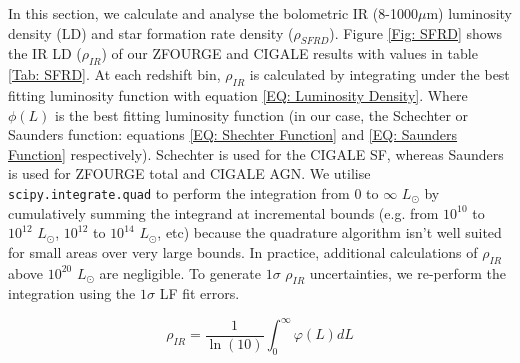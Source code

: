 In this section, we calculate and analyse the bolometric IR (8-1000$\mu$m) luminosity density (LD) and star formation rate density ($\rho_{SFRD}$). Figure \ref{Fig: SFRD} shows the IR LD ($\rho_{IR}$) of our ZFOURGE and CIGALE results with values in table \ref{Tab: SFRD}. At each redshift bin, $\rho_{IR}$ is calculated by integrating under the best fitting luminosity function with equation \ref{EQ: Luminosity Density}. Where $\phi(L)$ is the best fitting luminosity function (in our case, the Schechter or Saunders function: equations \ref{EQ: Shechter Function} and \ref{EQ: Saunders Function} respectively). Schechter is used for the CIGALE SF, whereas Saunders is used for ZFOURGE total and CIGALE AGN. We utilise \texttt{scipy.integrate.quad} \citep{virtanen_scipy_2020} to perform the integration from $0$ to $\infty$ $L_{\odot}$ by cumulatively summing the integrand at incremental bounds (e.g. from $10^{10}$ to $10^{12}$ $L_{\odot}$, $10^{12}$ to $10^{14}$ $L_{\odot}$, etc) because the quadrature algorithm isn't well suited for small areas over very large bounds. In practice, additional calculations of $\rho_{IR}$ above $10^{20}$ $L_{\odot}$ are negligible. To generate $1\sigma$ $\rho_{IR}$ uncertainties, we re-perform the integration using the $1 \sigma$ LF fit errors.

\begin{equation} 
    \rho_{IR} = \frac{1}{\ln(10)} \int_{0}^{\infty} \varphi(L) dL 
    \label{EQ: Luminosity Density}
\end{equation}

